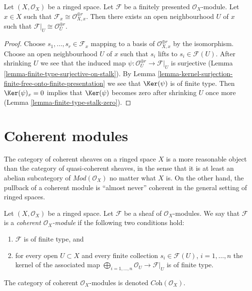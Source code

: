 \begin{lemma}
\label{lemma-finite-presentation-stalk-free}
Let $(X, \mathcal{O}_X)$ be a ringed space. Let $\mathcal{F}$ be
a finitely presented $\mathcal{O}_X$-module. Let $x \in X$ such that
$\mathcal{F}_x \cong \mathcal{O}_{X, x}^{\oplus r}$. Then there exists
an open neighbourhood $U$ of $x$ such that
$\mathcal{F}|_U \cong \mathcal{O}_U^{\oplus r}$.
\end{lemma}

\begin{proof}
Choose $s_1, \ldots, s_r \in \mathcal{F}_x$ mapping to a basis of
$\mathcal{O}_{X, x}^{\oplus r}$ by the isomorphism. Choose an open
neighbourhood $U$ of $x$ such that $s_i$ lifts to $s_i \in \mathcal{F}(U)$.
After shrinking $U$ we see that the induced map
$\psi : \mathcal{O}_U^{\oplus r} \to \mathcal{F}|_U$ is surjective
(Lemma \ref{lemma-finite-type-surjective-on-stalk}).
By Lemma \ref{lemma-kernel-surjection-finite-free-onto-finite-presentation}
we see that $\Ker(\psi)$ is of finite type.
Then $\Ker(\psi)_x = 0$ implies that $\Ker(\psi)$ becomes zero
after shrinking $U$ once more (Lemma \ref{lemma-finite-type-stalk-zero}).
\end{proof}





\section{Coherent modules}
\label{section-coherent}

\noindent
The category of coherent sheaves on a ringed space $X$
is a more reasonable object
than the category of quasi-coherent sheaves, in the sense
that it is at least an abelian subcategory of $\textit{Mod}(\mathcal{O}_X)$
no matter what $X$ is. On the other hand, the pullback of a
coherent module is ``almost never'' coherent in the general setting
of ringed spaces.

\begin{definition}
\label{definition-coherent}
Let $(X, \mathcal{O}_X)$ be a ringed space.
Let $\mathcal{F}$ be a sheaf of $\mathcal{O}_X$-modules.
We say that $\mathcal{F}$ is a {\it coherent $\mathcal{O}_X$-module}
if the following two conditions hold:
\begin{enumerate}
\item $\mathcal{F}$ is of finite type, and
\item for every open $U \subset X$ and every finite
collection $s_i \in \mathcal{F}(U)$, $i = 1, \ldots, n$
the kernel of the associated map
$\bigoplus_{i = 1, \ldots, n} \mathcal{O}_U \to \mathcal{F}|_U$
is of finite type.
\end{enumerate}
The category of coherent $\mathcal{O}_X$-modules is denoted
$\textit{Coh}(\mathcal{O}_X)$.
\end{definition}

